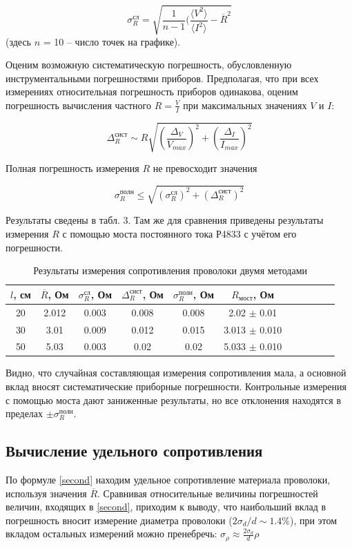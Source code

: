 \documentclass[a4paper, 12pt]{article}
\begin{document}
\[\sigma_R^\text{сл}=\sqrt{\frac{1}{n-1}(\frac{\langle V^2\rangle}{\langle I^2\rangle}-\overline{R}^2}\]
(здесь $n$ = 10 – число точек на графике).

Оценим возможную систематическую погрешность, обусловленную инструментальными
погрешностями приборов. Предполагая, что при всех измерениях относительная погрешность
приборов одинакова, оценим погрешность вычисления частного $R=\frac{V}{I}$ при максимальных
значениях $V$ и $I$:

\[\Delta^{\text{сист}}_R \sim R\sqrt{(\frac{\Delta_V}{V_{max}})^2+(\frac{\Delta_I}{I_{max}})^2}\]

Полная погрешность измерения $R$ не превосходит значения

\[\sigma_R^{\text{полн}} \leq \sqrt{(\sigma_R^\text{сл})^2 + (\Delta^{\text{сист}}_R)^2}\]

Результаты сведены в табл. 3. Там же для сравнения приведены результаты измерения $R$ с помощью моста постоянного тока Р4833 с учётом его погрешности.

\begin{table}[!h]
\begin{center}
\begin{tabular}{|c|c|c|c|c|c|c|c|c|c|c|}
\hline
$l$, см &$\overline{R}$, Ом & $\sigma_R^\text{сл}$, Ом  & $\Delta^{\text{сист}}_R$, Ом & $\sigma_R^{\text{полн}}$, Ом & $R_{\text{мост}}$, Ом \\ \hline
20 & 2.012 & 0.003 & 0.008 & 0.008 & 2.02 $\pm$ 0.01 \\ \hline
30 & 3.01 & 0.009 & 0.012 & 0.015 & 3.013 $\pm$ 0.010 \\ \hline
50 & 5.03 & 0.003 & 0.02 & 0.02 & 5.033 $\pm$ 0.010 \\ \hline
\end{tabular}
\caption{Результаты измерения сопротивления проволоки двумя методами}
\end{center}
\end{table}

Видно, что случайная составляющая измерения сопротивления мала, а основной вклад вносят систематические приборные погрешности. Контрольные измерения с помощью моста дают заниженные результаты, но все отклонения находятся в пределах $\pm \sigma^{\text{полн}}_{R}$.

\subsection*{Вычисление удельного сопротивления}

По формуле \eqref{second} находим удельное сопротивление материала проволоки, используя значения $\overline{R}$. Сравнивая относительные величины погрешностей величин, входящих в \eqref{second}, приходим к выводу, что наибольший вклад в погрешность вносит измерение диаметра проволоки ($2\sigma_d / d \sim 1.4\%$), при этом вкладом остальных измерений можно пренебречь: $\sigma_\rho\approx\frac{2\sigma_d}{d}\rho$
\end{document}
